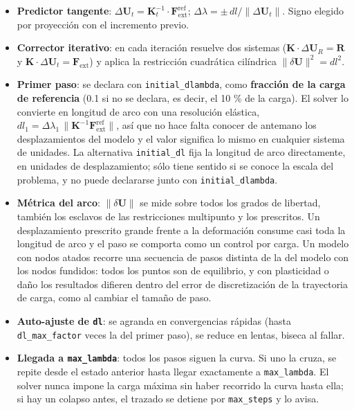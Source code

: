 \documentclass[11pt,oneside]{report}
\begin{document}
\begin{itemize}
  \item \textbf{Predictor tangente}: $\Delta\mathbf U_t = \mathbf K_t^{-1} \cdot \mathbf F_{\text{ext}}^{\text{ref}}$; $\Delta\lambda = \pm\,dl / \lVert\Delta\mathbf U_t\rVert$. Signo elegido por proyección con el incremento previo.
  \item \textbf{Corrector iterativo}: en cada iteración resuelve dos sistemas ($\mathbf K \cdot \Delta\mathbf U_R = \mathbf R$ y $\mathbf K \cdot \Delta\mathbf U_t = \mathbf F_{\text{ext}}$) y aplica la restricción cuadrática cilíndrica $\lVert\delta\mathbf U\rVert^2 = dl^2$.
  \item \textbf{Primer paso}: se declara con \texttt{initial\_dlambda}, como \textbf{fracción de la carga de referencia} (0.1 si no se declara, es decir, el 10 \% de la carga). El solver lo convierte en longitud de arco con una resolución elástica, $dl_1 = \Delta\lambda_1\,\lVert\mathbf K^{-1}\mathbf F_{\text{ext}}^{\text{ref}}\rVert$, así que no hace falta conocer de antemano los desplazamientos del modelo y el valor significa lo mismo en cualquier sistema de unidades. La alternativa \texttt{initial\_dl} fija la longitud de arco directamente, en unidades de desplazamiento; sólo tiene sentido si se conoce la escala del problema, y no puede declararse junto con \texttt{initial\_dlambda}.
  \item \textbf{Métrica del arco}: $\lVert\delta\mathbf U\rVert$ se mide sobre todos los grados de libertad, también los esclavos de las restricciones multipunto y los prescritos. Un desplazamiento prescrito grande frente a la deformación consume casi toda la longitud de arco y el paso se comporta como un control por carga. Un modelo con nodos atados recorre una secuencia de pasos distinta de la del modelo con los nodos fundidos: todos los puntos son de equilibrio, y con plasticidad o daño los resultados difieren dentro del error de discretización de la trayectoria de carga, como al cambiar el tamaño de paso.
  \item \textbf{Auto-ajuste de \texttt{dl}}: se agranda en convergencias rápidas (hasta \texttt{dl\_max\_factor} veces la del primer paso), se reduce en lentas, biseca al fallar.
  \item \textbf{Llegada a \texttt{max\_lambda}}: todos los pasos siguen la curva. Si uno la cruza, se repite desde el estado anterior hasta llegar exactamente a \texttt{max\_lambda}. El solver nunca impone la carga máxima sin haber recorrido la curva hasta ella; si hay un colapso antes, el trazado se detiene por \texttt{max\_steps} y lo avisa.
\end{itemize}
\end{document}
